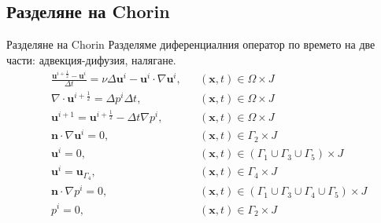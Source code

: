\documentclass{beamer}
\newcommand{\divg}[1]{\nabla\cdot#1}
\newcommand{\grad}[1]{\nabla#1}
\newcommand{\lapl}[1]{\Delta#1}
\newcommand{\vecf}[1]{\textbf{#1}}
\begin{document}
    \subsection{Разделяне на Chorin}
    \begin{frame}{Разделяне на Chorin}
    	Разделяме диференциалния оператор по времето на две части: адвекция-дифузия, налягане.
    	\begin{align*}
	&\frac{\vecf{u}^{i + \frac{1}{2}} - \vecf{u}^{i}}{\Delta t} = \nu \Delta \vecf{u}^i - \vecf{u}^i \cdot \nabla\vecf{u}^i, && \left(\mathbf{x}, t\right) \in \Omega \times J \\
	&\divg{\vecf{u}^{i + \frac{1}{2}}} = \lapl{p^i} \Delta t, && \left(\mathbf{x}, t\right) \in \Omega \times J \\
	&\vecf{u}^{i+1} = \vecf{u}^{i+\frac{1}{2}} - \Delta t \grad{p^{i}}, && \left(\mathbf{x}, t\right) \in \Omega \times J  \\
  &\vecf{n} \cdot \grad{\vecf{u}^i} = 0, && \left(\mathbf{x}, t\right) \in \Gamma_2 \times J \\
  &\vecf{u}^i = 0, &&\left(\mathbf{x}, t\right) \in \left(\Gamma_1 \cup \Gamma_3 \cup \Gamma_5\right) \times J \\
  &\vecf{u}^i = \vecf{u}_{\Gamma_4}, && \left(\mathbf{x}, t\right) \in \Gamma_4 \times J \\
  &\vecf{n} \cdot \grad{p^i} = 0, && \left(\mathbf{x}, t\right) \in (\Gamma_1 \cup \Gamma_3 \cup \Gamma_4 \cup \Gamma_5) \times J \\
  &p^i = 0, && \left(\mathbf{x}, t\right) \in \Gamma_2 \times J
\end{align*}
    \end{frame}
\end{document}
